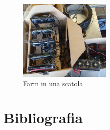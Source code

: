\documentclass[12pt,a4paper]{article}
\begin{document}
\begin{figure}[h]
    \centering
    \includegraphics[width=0.40\textwidth]{./images/mini_farm.png}
    \caption{Farm in una scatola}
    \label{fig:mkini_farm}
\end{figure}


\newpage

\section{Bibliografia}
\end{document}
